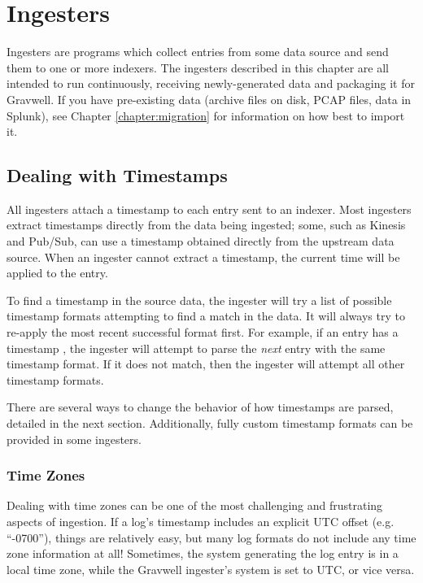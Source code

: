 \chapter{Ingesters}
Ingesters are programs which collect entries from some data source and
send them to one or more indexers. The ingesters described in this chapter
are all intended to run continuously, receiving newly-generated data
and packaging it for Gravwell. If you have pre-existing data (archive
files on disk, PCAP files, data in Splunk), see Chapter \ref{chapter:migration}
for information on how best to import it.

\section{Dealing with Timestamps}
\label{sec:timestamps}
All ingesters attach a timestamp to each entry sent to an indexer. Most ingesters extract timestamps directly from the data being ingested; some, such as Kinesis and Pub/Sub, can use a timestamp obtained directly from the upstream data source. When an ingester cannot extract a timestamp, the current time will be applied to the entry.

To find a timestamp in the source data, the ingester will try a list of possible timestamp formats attempting to find a match in the data.
It will always try to re-apply the most recent successful format first. For example, if an entry has a timestamp , the ingester will attempt to parse the \emph{next} entry with the same timestamp format. If it does not match, then the ingester will attempt all other timestamp formats.

There are several ways to change the behavior of how timestamps are parsed, detailed in the next section. Additionally, fully custom timestamp formats can be provided in some ingesters.

\subsection{Time Zones}

Dealing with time zones can be one of the most challenging and frustrating aspects of ingestion. If a log's timestamp includes an explicit UTC offset (e.g. ``-0700''), things are relatively easy, but many log formats do not include any time zone information at all! Sometimes, the system generating the log entry is in a local time zone, while the Gravwell ingester's system is set to UTC, or vice versa.

